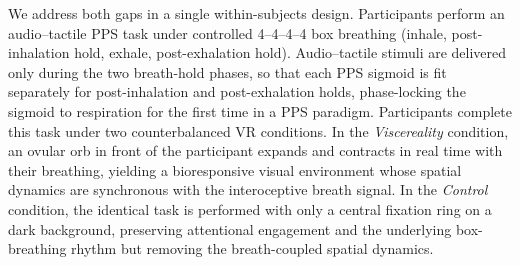 We address both gaps in a single within-subjects design. Participants perform an audio--tactile PPS task under controlled 4--4--4--4 box breathing (inhale, post-inhalation hold, exhale, post-exhalation hold). Audio--tactile stimuli are delivered only during the two breath-hold phases, so that each PPS sigmoid is fit separately for post-inhalation and post-exhalation holds, phase-locking the sigmoid to respiration for the first time in a PPS paradigm. Participants complete this task under two counterbalanced VR conditions. In the \emph{Viscereality} condition, an ovular orb in front of the participant expands and contracts in real time with their breathing, yielding a bioresponsive visual environment whose spatial dynamics are synchronous with the interoceptive breath signal. In the \emph{Control} condition, the identical task is performed with only a central fixation ring on a dark background, preserving attentional engagement and the underlying box-breathing rhythm but removing the breath-coupled spatial dynamics.

